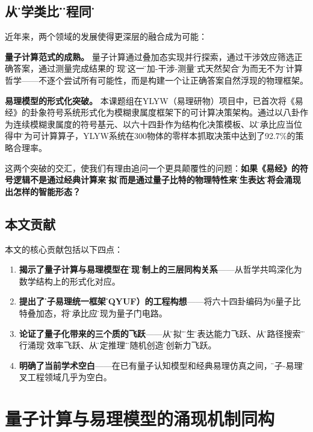 \documentclass[twocolumn]{article}
\begin{document}
\subsection{从\"哲学类比\"到\"工程同构\"}

近年来，两个领域的发展使得更深层的融合成为可能：

\textbf{量子计算范式的成熟。} 量子计算通过叠加态实现并行探索，通过干涉效应筛选正确答案，通过测量完成结果的\"涌现\"。这一\"叠加-干涉-测量\"范式天然契合\"无为而无不为\"的计算哲学——不逐个尝试所有可能性，而是构建一个让正确答案自然浮现的物理框架\cite{nielsen2010}。

\textbf{易理模型的形式化突破。} 本课题组在YLYW（易理研物）项目中，已首次将《易经》的卦象符号系统形式化为模糊隶属度框架下的可计算决策架构\cite{ylyw2026}。通过以八卦作为连续模糊隶属度的符号基元、以六十四卦作为结构化决策模板、以\"乘承比应当位得中\"作为可计算算子，YLYW系统在300物体的零样本抓取决策中达到了92.7\%的策略合理率。

这两个突破的交汇，使我们有理由追问一个更具颠覆性的问题：\textbf{如果《易经》的符号逻辑不是通过经典计算来\"模拟\"，而是通过量子比特的物理特性来\"原生表达\"，将会涌现出怎样的智能形态？}

\subsection{本文贡献}

本文的核心贡献包括以下四点：

\begin{enumerate}
  \item \textbf{揭示了量子计算与易理模型在\"涌现\"机制上的三层同构关系}——从哲学共鸣深化为数学结构上的形式化对应。
  \item \textbf{提出了\"量子易理统一框架\"（QYUF）的工程构想}——将六十四卦编码为6量子比特叠加态，将\"乘承比应\"实现为量子门电路。
  \item \textbf{论证了量子化带来的三个质的飞跃}——从\"模拟\"到\"原生\"的表达能力飞跃、从\"逐路径搜索\"到\"并行涌现\"的效率飞跃、从\"确定推理\"到\"真随机创造\"的创新力飞跃。
  \item \textbf{明确了当前学术空白}——在已有量子认知模型\cite{busemeyer2015}和经典易理仿真之间，\"量子-易理\"交叉工程领域几乎为空白。
\end{enumerate}

\section{量子计算与易理模型的涌现机制同构}
\end{document}
